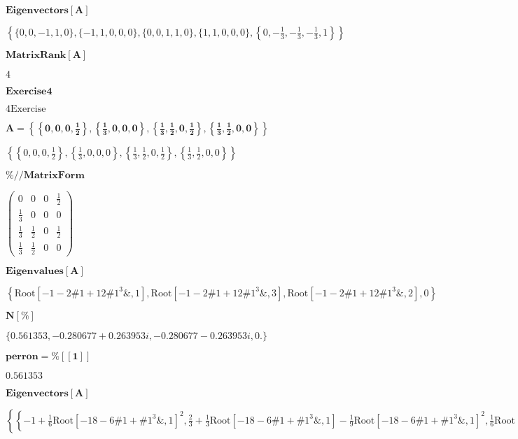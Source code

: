 \documentclass{article}
\begin{document}
\noindent\(\pmb{\text{Eigenvectors}[A]}\)

\noindent\(\left\{\{0,0,-1,1,0\},\{-1,1,0,0,0\},\{0,0,1,1,0\},\{1,1,0,0,0\},\left\{0,-\frac{1}{3},-\frac{1}{3},-\frac{1}{3},1\right\}\right\}\)

\noindent\(\pmb{\text{MatrixRank}[A]}\)

\noindent\(4\)

\noindent\(\pmb{\text{Exercise} 4}\)

\noindent\(4 \text{Exercise}\)

\noindent\(\pmb{A=\left\{\left\{0,0,0,\frac{1}{2}\right\},\left\{\frac{1}{3},0,0,0\right\},\left\{\frac{1}{3},\frac{1}{2},0,\frac{1}{2}\right\},\left\{\frac{1}{3},\frac{1}{2},0,0\right\}\right\}}\)

\noindent\(\left\{\left\{0,0,0,\frac{1}{2}\right\},\left\{\frac{1}{3},0,0,0\right\},\left\{\frac{1}{3},\frac{1}{2},0,\frac{1}{2}\right\},\left\{\frac{1}{3},\frac{1}{2},0,0\right\}\right\}\)

\noindent\(\pmb{\%\text{//}\text{MatrixForm}}\)

\noindent\(\left(
\begin{array}{cccc}
 0 & 0 & 0 & \frac{1}{2} \\
 \frac{1}{3} & 0 & 0 & 0 \\
 \frac{1}{3} & \frac{1}{2} & 0 & \frac{1}{2} \\
 \frac{1}{3} & \frac{1}{2} & 0 & 0
\end{array}
\right)\)

\noindent\(\pmb{\text{Eigenvalues}[A]}\)

\noindent\(\left\{\text{Root}\left[-1-2 \text{$\#$1}+12 \text{$\#$1}^3\&,1\right],\text{Root}\left[-1-2 \text{$\#$1}+12 \text{$\#$1}^3\&,3\right],\text{Root}\left[-1-2
\text{$\#$1}+12 \text{$\#$1}^3\&,2\right],0\right\}\)

\noindent\(\pmb{N[\%]}\)

\noindent\(\{0.561353,-0.280677+0.263953 i,-0.280677-0.263953 i,0.\}\)

\noindent\(\pmb{\text{perron}=\%[[1]]}\)

\noindent\(0.561353\)

\noindent\(\pmb{\text{Eigenvectors}[A]}\)

\noindent\(\left\{\left\{-1+\frac{1}{6} \text{Root}\left[-18-6 \text{$\#$1}+\text{$\#$1}^3\&,1\right]^2,\frac{2}{3}+\frac{1}{3} \text{Root}\left[-18-6
\text{$\#$1}+\text{$\#$1}^3\&,1\right]-\frac{1}{9} \text{Root}\left[-18-6 \text{$\#$1}+\text{$\#$1}^3\&,1\right]^2,\frac{1}{6} \text{Root}\left[-18-6
\text{$\#$1}+\text{$\#$1}^3\&,1\right]^2,1\right\},\left\{-1+\frac{1}{6} \text{Root}\left[-18-6 \text{$\#$1}+\text{$\#$1}^3\&,3\right]^2,\frac{2}{3}+\frac{1}{3}
\text{Root}\left[-18-6 \text{$\#$1}+\text{$\#$1}^3\&,3\right]-\frac{1}{9} \text{Root}\left[-18-6 \text{$\#$1}+\text{$\#$1}^3\&,3\right]^2,\frac{1}{6}
\text{Root}\left[-18-6 \text{$\#$1}+\text{$\#$1}^3\&,3\right]^2,1\right\},\left\{-1+\frac{1}{6} \text{Root}\left[-18-6 \text{$\#$1}+\text{$\#$1}^3\&,2\right]^2,\frac{2}{3}+\frac{1}{3}
\text{Root}\left[-18-6 \text{$\#$1}+\text{$\#$1}^3\&,2\right]-\frac{1}{9} \text{Root}\left[-18-6 \text{$\#$1}+\text{$\#$1}^3\&,2\right]^2,\frac{1}{6}
\text{Root}\left[-18-6 \text{$\#$1}+\text{$\#$1}^3\&,2\right]^2,1\right\},\{0,0,1,0\}\right\}\)
\end{document}
